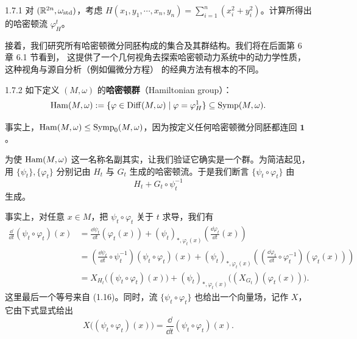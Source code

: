 \begin{wexer}{1.7.1}
对 $(\mathbb{R}^{2n},\omega_{\mathrm{std}})$，考虑
$H(x_1,y_1,\cdots,x_n,y_n)=\sum\limits_{i=1}^{n}(x_i^2+y_i^2)$。计算所得出的哈密顿流
$\varphi_H^t$。
\end{wexer}

接着，我们研究所有哈密顿微分同胚构成的集合及其群结构。我们将在后面第 6 章 6.1 节看到，
这提供了一个几何视角去探索哈密顿动力系统中的动力学性质，这种视角与源自分析（例如偏微分方程）
的经典方法有根本的不同。

\begin{wdefn}{1.7.2}
如下定义 $(M,\omega)$ 的\textbf{哈密顿群}（Hamiltonian group）：
\[
  \operatorname{Ham}(M,\omega):=\{\varphi\in\operatorname{Diff}(M,\omega)\mid\varphi=\varphi_H^1\}
  \subseteq\operatorname{Symp}(M,\omega).
\]
\end{wdefn}

事实上，$\operatorname{Ham}(M,\omega)\le\operatorname{Symp}_0(M,\omega)$，因为按定义任何哈密顿微分同胚都连回
$\mathbf{1}$。

为使 $\operatorname{Ham}(M,\omega)$ 这一名称名副其实，让我们验证它确实是一个群。为简洁起见，用
$\{\psi_t\},\{\varphi_t\}$ 分别记由 $H_t$ 与 $G_t$ 生成的哈密顿流。于是我们断言
$\{\psi_t\circ\varphi_t\}$ 由
\begin{equation}
  H_t+G_t\circ\psi_t^{-1}
  \tag{1.17}
\end{equation}
生成。

事实上，对任意 $x\in M$，把 $\psi_t\circ\varphi_t$ 关于 $t$ 求导，我们有
\[
  \begin{aligned}
    \frac{\dd}{\dd t}(\psi_t\circ\varphi_t)(x)
    &=\frac{\dd\psi_t}{\dd t}(\varphi_t(x))
      +(\psi_t)_{*,\varphi_t(x)}\left(\frac{\dd\varphi_t}{\dd t}(x)\right)\\
    &=\left(\frac{\dd\psi_t}{\dd t}\circ\psi_t^{-1}\right)(\psi_t\circ\varphi_t)(x)
      +(\psi_t)_{*,\varphi_t(x)}
      \left(\left(\frac{\dd\varphi_t}{\dd t}\circ\varphi_t^{-1}\right)(\varphi_t(x))\right)\\
    &=X_{H_t}\big((\psi_t\circ\varphi_t)(x)\big)
      +(\psi_t)_{*,\varphi_t(x)}\big((X_{G_t})(\varphi_t(x))\big).
  \end{aligned}
\]
这里最后一个等号来自 (1.16)。同时，流 $\{\psi_t\circ\varphi_t\}$ 也给出一个向量场，记作 $X$，
它由下式显式给出
\[
  X\big((\psi_t\circ\varphi_t)(x)\big)=\frac{\dd}{\dd t}(\psi_t\circ\varphi_t)(x).
\]

